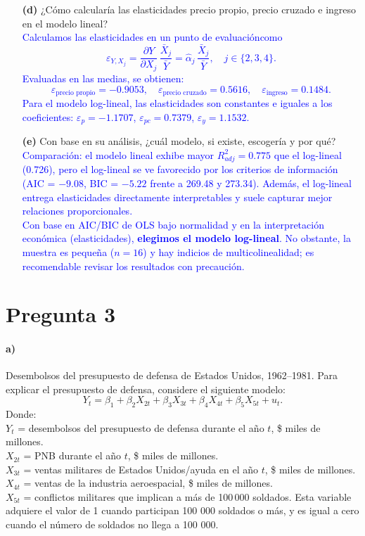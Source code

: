 \documentclass[10pt]{article}
\begin{document}
\begin{enumerate}
    \item[\textbf{(d)}] ¿Cómo calcularía las elasticidades precio propio, precio cruzado e ingreso en el modelo lineal?\\
    \textcolor{blue}{
        Calculamos las elasticidades en un punto de evaluacióncomo
        \[
        \varepsilon_{Y,X_j}= \frac{\partial Y}{\partial X_j}\,\frac{\bar X_j}{\bar Y}=\hat{\alpha}_j\,\frac{\bar X_j}{\bar Y},\quad j\in\{2,3,4\}.
        \]
        Evaluadas en las medias, se obtienen:
        \[
        \varepsilon_{\text{precio propio}}=-0.9053,\quad \varepsilon_{\text{precio cruzado}}=0.5616,\quad \varepsilon_{\text{ingreso}}=0.1484.
        \]
        Para el modelo log-lineal, las elasticidades son constantes e iguales a los coeficientes: \(\varepsilon_{p}=-1.1707\), \(\varepsilon_{pc}=0.7379\), \(\varepsilon_{y}=1.1532\).
    }
    
    \item[\textbf{(e)}] Con base en su análisis, ¿cuál modelo, si existe, escogería y por qué?\\
    \textcolor{blue}{
        Comparación: el modelo lineal exhibe mayor \(R^2_{adj}=0.775\) que el log-lineal (0.726), pero el log-lineal se ve favorecido por los criterios de información (AIC = \(-9.08\), BIC = \(-5.22\) frente a 269.48 y 273.34). Además, el log-lineal entrega elasticidades directamente interpretables y suele capturar mejor relaciones proporcionales.\\
        Con base en AIC/BIC de OLS bajo normalidad y en la interpretación económica (elasticidades), \textbf{elegimos el modelo log-lineal}. No obstante, la muestra es pequeña (\(n=16\)) y hay indicios de multicolinealidad; es recomendable revisar los resultados con precaución.
    }
\end{enumerate}
\section{Pregunta 3}

\paragraph*{a)} Desembolsos del presupuesto de defensa de Estados Unidos, 1962--1981. Para explicar el presupuesto de defensa, considere el siguiente modelo:
\[
Y_t = \beta_1 + \beta_2 X_{2t} + \beta_3 X_{3t} + \beta_4 X_{4t} + \beta_5 X_{5t} + u_t.
\]
Donde: \\
$Y_t$ = desembolsos del presupuesto de defensa durante el año $t$, \$ miles de millones.\\
$X_{2t}$ = PNB durante el año $t$, \$ miles de millones.\\
$X_{3t}$ = ventas militares de Estados Unidos/ayuda en el año $t$, \$ miles de millones.\\
$X_{4t}$ = ventas de la industria aeroespacial, \$ miles de millones.\\
$X_{5t}$ = conflictos militares que implican a más de 100\,000 soldados. Esta variable adquiere el valor de 1 cuando
participan 100 000 soldados o más, y es igual a cero cuando el número de soldados no llega a 100 000. 
\end{document}
